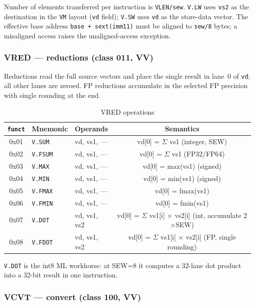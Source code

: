 \documentclass[11pt,a4paper]{article}
\begin{document}
Number of elements transferred per instruction is {\tt VLEN/sew}. {\tt V.LW}
uses {\tt vs2} as the destination in the {\tt VM} layout ({\tt vd} field);
{\tt V.SW} uses {\tt vd} as the store-data vector. The effective base address
{\tt base + sext(imm11)} must be aligned to {\tt sew/8} bytes; a misaligned
access raises the unaligned-access exception.

\subsubsection*{VRED --- reductions (class 011, VV)}

Reductions read the full source vectors and place the single result in lane~0
of {\tt vd}; all other lanes are zeroed. FP reductions accumulate in the
selected FP precision with single rounding at the end.

\begin{table}[H]
\centering
\caption{VRED operations}
\begin{tabular}{cllc}
\toprule
{\tt funct} & Mnemonic & Operands & Semantics \\
\midrule
0x01 & {\tt V.SUM}  & vd, vs1, --- & vd[0] = $\Sigma$ vs1 (integer, SEW) \\
0x02 & {\tt V.FSUM} & vd, vs1, --- & vd[0] = $\Sigma$ vs1 (FP32/FP64) \\
0x03 & {\tt V.MAX}  & vd, vs1, --- & vd[0] = max(vs1) (signed) \\
0x04 & {\tt V.MIN}  & vd, vs1, --- & vd[0] = min(vs1) (signed) \\
0x05 & {\tt V.FMAX} & vd, vs1, --- & vd[0] = fmax(vs1) \\
0x06 & {\tt V.FMIN} & vd, vs1, --- & vd[0] = fmin(vs1) \\
0x07 & {\tt V.DOT}  & vd, vs1, vs2 & vd[0] = $\Sigma$ vs1[i] $\times$ vs2[i] (int, accumulate 2$\times$SEW) \\
0x08 & {\tt V.FDOT} & vd, vs1, vs2 & vd[0] = $\Sigma$ vs1[i] $\times$ vs2[i] (FP, single rounding) \\
\bottomrule
\end{tabular}
\end{table}

{\tt V.DOT} is the int8 ML workhorse: at SEW=8 it computes a 32-lane
dot product into a 32-bit result in one instruction.

\subsubsection*{VCVT --- convert (class 100, VV)}
\end{document}

